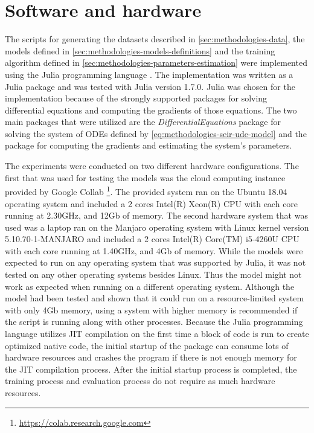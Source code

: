 \section{Software and hardware}

The scripts for generating the datasets described in \autoref{sec:methodologies-data}, the models defined in \autoref{sec:methodologies-models-definitions} and the training algorithm defined in \autoref{sec:methodologies-parameters-estimation} were implemented using the Julia programming language \cite{bezanson2012julia}.
The implementation was written as a Julia package and was tested with Julia version 1.7.0.
Julia was chosen for the implementation because of the strongly supported packages for solving differential equations and computing the gradients of those equations.
The two main packages that were utilized are the \textit{DifferentialEquations} package \cite{rackauckas2017differentialequations} for solving the system of \glspl{ODE} defined by \autoref{eq:methodologies-seir-ude-model} and the  \cite{rackauckasUniversalDifferentialEquations2020} package for computing the gradients and estimating the system's parameters.

The experiments were conducted on two different hardware configurations.
The first that was used for testing the models was the cloud computing instance provided by Google Collab \footnote{\url{https://colab.research.google.com}}.
The provided system ran on the Ubuntu 18.04 operating system and included a 2 cores Intel(R) Xeon(R) CPU with each core running at 2.30GHz, and 12Gb of memory.
The second hardware system that was used was a laptop ran on the Manjaro operating system with Linux kernel version 5.10.70-1-MANJARO and included a 2 cores Intel(R) Core(TM) i5-4260U CPU with each core running at 1.40GHz, and 4Gb of memory.
While the models were expected to run on any operating system that was supported by Julia, it was not tested on any other operating systems besides Linux.
Thus the model might not work as expected when running on a different operating system.
Although the model had been tested and shown that it could run on a resource-limited system with only 4Gb memory, using a system with higher memory is recommended if the script is running along with other processes.
Because the Julia programming language utilizes \gls{JIT} compilation on the first time a block of code is run to create optimized native code, the initial startup of the package can consume lots of hardware resources and crashes the program if there is not enough memory for the \gls{JIT} compilation process.
After the initial startup process is completed, the training process and evaluation process do not require as much hardware resources.
